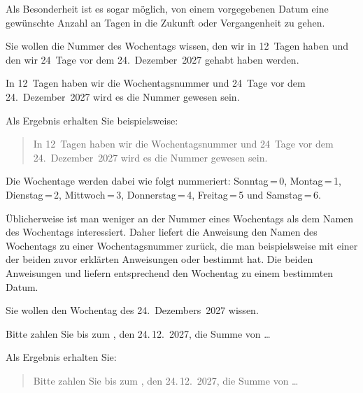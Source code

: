 Als Besonderheit ist es sogar möglich, von einem vorgegebenen Datum eine
gewünschte Anzahl an Tagen in die Zukunft oder Vergangenheit zu gehen.
\begin{Example}
  Sie wollen die Nummer des Wochentags wissen, den wir in 12~Tagen haben und
  den wir 24~Tage vor dem 24.~Dezember~2027 gehabt haben werden.
\begin{lstcode}
  In 12~Tagen haben wir die Wochentagsnummer
  \the{} und
  24~Tage vor dem 24.~Dezember~2027 wird es
  die Nummer \the{}
  gewesen sein.
\end{lstcode}
  Als Ergebnis erhalten Sie beispielsweise:
  \begin{quote}
  In 12~Tagen haben wir die Wochentagsnummer
  \the{} und
  24~Tage vor dem 24.~Dezember~2027 wird es
  die Nummer \the{}
  gewesen sein.
  \end{quote}
\end{Example}

Die Wochentage werden dabei wie folgt nummeriert: Sonntag\,=\,0, Montag\,=\,1,
Dienstag\,=\,2, Mittwoch\,=\,3, Donnerstag\,=\,4, Freitag\,=\,5 und
Samstag\,=\,6.%
%
\EndIndexGroup


\begin{Declaration}
\end{Declaration}%
Üblicherweise ist man weniger an der
Nummer eines Wochentags als dem Namen des Wochentags interessiert. Daher
liefert die Anweisung  den Namen des Wochentags zu
einer Wochentagsnummer zurück, die man beispielsweise mit einer der beiden
zuvor erklärten Anweisungen  oder
 bestimmt hat. Die beiden Anweisungen
 und  liefern entsprechend den Wochentag zu
einem bestimmten Datum.

\begin{Example}
   Sie wollen den Wochentag des 24.~Dezembers~2027 wissen.
\begin{lstcode}
  Bitte zahlen Sie bis zum , 
  den 24.\,12.~2027, die Summe von \dots
\end{lstcode}
  Als Ergebnis erhalten Sie:
  \begin{quote}
  Bitte zahlen Sie bis zum 
  , den 
  24.\,12.~2027, die Summe von \dots
  \end{quote}
\end{Example}
 
